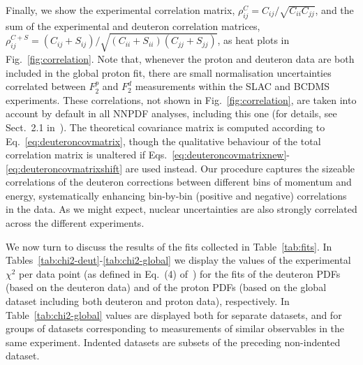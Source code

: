 \documentclass[11pt,a4paper]{article}
\begin{document}
Finally, we show the experimental correlation
matrix, $\rho_{ij}^C=C_{ij}/\sqrt{C_{ii}C_{jj}}$, and the sum of the experimental
and deuteron correlation matrices,
$\rho_{ij}^{C+S}=(C_{ij}+S_{ij})/\sqrt{(C_{ii}+S_{ii})(C_{jj}+S_{jj})}$, as heat
plots in Fig.~\ref{fig:correlation}.
Note that, whenever the proton and deuteron data are both included in the
global proton fit, there are small normalisation uncertainties correlated
between $F_2^p$ and $F_2^d$ measurements within the SLAC and BCDMS experiments.
These correlations, not shown in Fig.~\ref{fig:correlation}, are taken into
account by default in all NNPDF analyses, including this one (for details,
see Sect.~2.1 in~\cite{Forte:2002fg}).
The theoretical covariance matrix is computed according to
Eq.~\eqref{eq:deuteroncovmatrix}, though the
qualitative behaviour of the total correlation matrix is unaltered if
Eqs.~\eqref{eq:deuteroncovmatrixnew}-\eqref{eq:deuteroncovmatrixshift} are
used instead. Our procedure captures
the sizeable correlations of the deuteron corrections between different
bins of momentum and energy, systematically enhancing bin-by-bin (positive and
negative) correlations in the data. As we might expect, nuclear
uncertainties are also strongly correlated across the different experiments.

We now turn to discuss the results of the fits collected in
Table~\ref{tab:fits}. In Tables~\ref{tab:chi2-deut}-\ref{tab:chi2-global}
we display the values of the experimental $\chi^2$ per data point (as defined
in Eq.~(4) of~\cite{Ball:2018twp}) for the fits of the deuteron PDFs (based on
the deuteron data) and of the proton PDFs (based on the global dataset
including both deuteron and proton data), respectively.
In Table~\ref{tab:chi2-global} values are displayed both for separate
datasets, and for groups of datasets corresponding to measurements of similar
observables in the same experiment. Indented datasets are subsets of the
preceding non-indented dataset.



\end{document}
